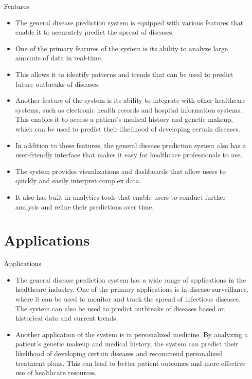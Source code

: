 \documentclass{SKP-beamer}
\begin{document}
\begin{frame}{Features}
	\begin{itemize}
		\item The general disease prediction system is equipped with various features that enable it to accurately predict the spread of diseases. 
		\item One of the primary features of the system is its ability to analyze large amounts of data in real-time. 
		\item This allows it to identify patterns and trends that can be used to predict future outbreaks of diseases. 
		\item Another feature of the system is its ability to integrate with other healthcare systems, such as electronic health records and hospital information systems. This enables it to access a patient's medical history and genetic makeup, which can be used to predict their likelihood of developing certain diseases.
		\item In addition to these features, the general disease prediction system also has a user-friendly interface that makes it easy for healthcare professionals to use. 
		\item The system provides visualizations and dashboards that allow users to quickly and easily interpret complex data. 
		\item It also has built-in analytics tools that enable users to conduct further analysis and refine their predictions over time.
		
	\end{itemize}
\end{frame}

\section{\textbf{Applications}}

\begin{frame}{Applications}
	\begin{itemize}
		\item The general disease prediction system has a wide range of applications in the healthcare industry. One of the primary applications is in disease surveillance, where it can be used to monitor and track the spread of infectious diseases. The system can also be used to predict outbreaks of diseases based on historical data and current trends.
		\item Another application of the system is in personalized medicine. By analyzing a patient's genetic makeup and medical history, the system can predict their likelihood of developing certain diseases and recommend personalized treatment plans. This can lead to better patient outcomes and more effective use of healthcare resources.
	\end{itemize}
\end{frame}
\end{document}
